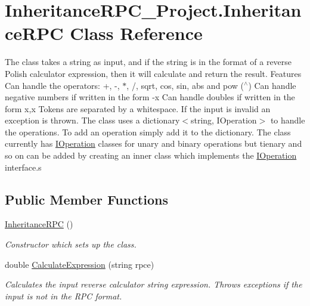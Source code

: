 \hypertarget{class_inheritance_r_p_c___project_1_1_inheritance_r_p_c}{\section{Inheritance\+R\+P\+C\+\_\+\+Project.\+Inheritance\+R\+P\+C Class Reference}
\label{class_inheritance_r_p_c___project_1_1_inheritance_r_p_c}
}


The class takes a string as input, and if the string is in the format of a reverse Polish calculator expression, then it will calculate and return the result. Features Can handle the operators\+: +, -\/, $\ast$, /, sqrt, cos, sin, abs and pow ($^\wedge$) Can handle negative numbers if written in the form -\/x Can handle doubles if written in the form x,x Tokens are separated by a whitespace. If the input is invalid an exception is thrown. The class uses a dictionary$<$string, I\+Operation$>$ to handle the operations. To add an operation simply add it to the dictionary. The class currently has \hyperlink{interface_inheritance_r_p_c___project_1_1_i_operation}{I\+Operation} classes for unary and binary operations but tienary and so on can be added by creating an inner class which implements the \hyperlink{interface_inheritance_r_p_c___project_1_1_i_operation}{I\+Operation} interface.\+s  


\subsection*{Public Member Functions}
\begin{DoxyCompactItemize}
\item 
\hyperlink{class_inheritance_r_p_c___project_1_1_inheritance_r_p_c_ad34c70442f6f3696e800c3937f5bfd20}{Inheritance\+R\+P\+C} ()
\begin{DoxyCompactList}\small\item\em Constructor which sets up the class. \end{DoxyCompactList}\item 
double \hyperlink{class_inheritance_r_p_c___project_1_1_inheritance_r_p_c_a98c2f1992b820eba5b7528554c3c7d96}{Calculate\+Expression} (string rpce)
\begin{DoxyCompactList}\small\item\em Calculates the input reverse calculator string expression. Throws exceptions if the input is not in the R\+P\+C format. \end{DoxyCompactList}\end{DoxyCompactItemize}


